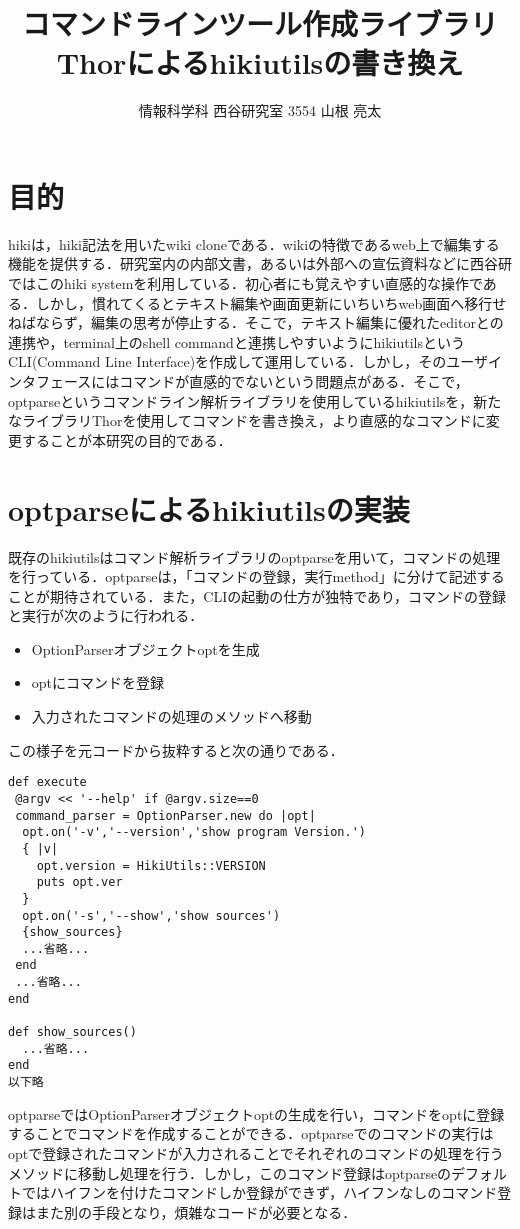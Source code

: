 \documentclass[a4j,twocolumn]{jsarticle}
\begin{document}
\title{コマンドラインツール作成ライブラリThorによるhikiutilsの書き換え}
\author{情報科学科 西谷研究室 3554 山根 亮太}
\date{}
\maketitle
\section{目的}
\vspace{-0.5em}
hikiは，hiki記法を用いたwiki cloneである．wikiの特徴であるweb上で編集する機能を提供する．研究室内の内部文書，あるいは外部への宣伝資料などに西谷研ではこのhiki systemを利用している．初心者にも覚えやすい直感的な操作である．しかし，慣れてくるとテキスト編集や画面更新にいちいちweb画面へ移行せねばならず，編集の思考が停止する．そこで，テキスト編集に優れたeditorとの連携や，terminal上のshell commandと連携しやすいようにhikiutilsというCLI(Command Line Interface)を作成して運用している\cite{hikiutils}．しかし，そのユーザインタフェースにはコマンドが直感的でないという問題点がある．そこで，optparse\cite{optparse}というコマンドライン解析ライブラリを使用しているhikiutilsを，新たなライブラリThor\cite{thor}を使用してコマンドを書き換え，より直感的なコマンドに変更することが本研究の目的である．

\section{optparseによるhikiutilsの実装}
\vspace{-0.5em}
既存のhikiutilsはコマンド解析ライブラリのoptparseを用いて，コマンドの処理を行っている．optparseは，「コマンドの登録，実行method」に分けて記述することが期待されている．また，CLIの起動の仕方が独特であり，コマンドの登録と実行が次のように行われる．
\begin{itemize}
\item OptionParserオブジェクトoptを生成
\item optにコマンドを登録
\item 入力されたコマンドの処理のメソッドへ移動
\end{itemize}

この様子を元コードから抜粋すると次の通りである．

\begin{lstlisting}[style=customRuby,basicstyle={\scriptsize\ttfamily}]
def execute
 @argv << '--help' if @argv.size==0
 command_parser = OptionParser.new do |opt|
  opt.on('-v','--version','show program Version.') 
  { |v|
    opt.version = HikiUtils::VERSION
    puts opt.ver
  }
  opt.on('-s','--show','show sources')
  {show_sources}                
  ...省略...
 end
 ...省略...
end     
  
def show_sources()
  ...省略...
end
以下略
\end{lstlisting}
optparseではOptionParserオブジェクトoptの生成を行い，コマンドをoptに登録することでコマンドを作成することができる．optparseでのコマンドの実行はoptで登録されたコマンドが入力されることでそれぞれのコマンドの処理を行うメソッドに移動し処理を行う．しかし，このコマンド登録はoptparseのデフォルトではハイフンを付けたコマンドしか登録ができず，ハイフンなしのコマンド登録はまた別の手段となり，煩雑なコードが必要となる．
\end{document}
